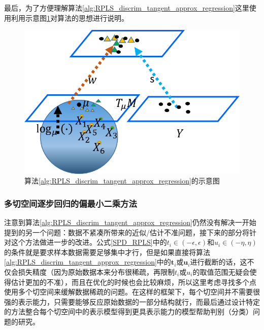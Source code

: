 最后，为了方便理解算法\ref{alg:RPLS_discrim_tangent_approx_regression}这里使用利用示意图\ref{fig:discrim_tangent_RPLS}对算法的思想进行说明。
\begin{figure}
	\centering
	\includegraphics[width=0.5\linewidth]{source/Discrim_Tangent_PLS.png}
	\caption{算法\ref{alg:RPLS_discrim_tangent_approx_regression}的示意图}
	\label{fig:discrim_tangent_RPLS}
\end{figure}
\subsubsection{多切空间逐步回归的偏最小二乘方法}
\label{sec:muliti_tangent_rpls}
注意到算法\ref{alg:RPLS_discrim_tangent_approx_regression}仍然没有解决一开始提到的另一个问题：数据不紧凑所带来的近似/估计不准问题，接下来的部分将针对这个方法做进一步的改进。公式\ref{SPD_RPLS}中的$t_i \in (-\epsilon,\epsilon)$和$u_i \in (-\eta,\eta)$的条件就是要求样本数据需要足够集中才行，但是如果直接将算法\ref{alg:RPLS_discrim_tangent_approx_regression}中的$\bm{t}_i$或$\bm{u}_i$进行截断的话，这不仅会损失精度（因为原始数据本来分布很稀疏，再限制$t_i$或$u_i$的取值范围无疑会使得估计更加的不准），而且在优化的时候也会比较麻烦，所以这里考虑寻找多个点使用多个切空间来缓解数据稀疏的问题。在这样的框架下，每个切空间并不需要很强的表示能力，只需要能够反应原始数据的一部分结构就行，而最后通过设计特定的方法整合每个切空间中的表示模型得到更具表示能力的模型帮助判别（分类）问题的研究。

